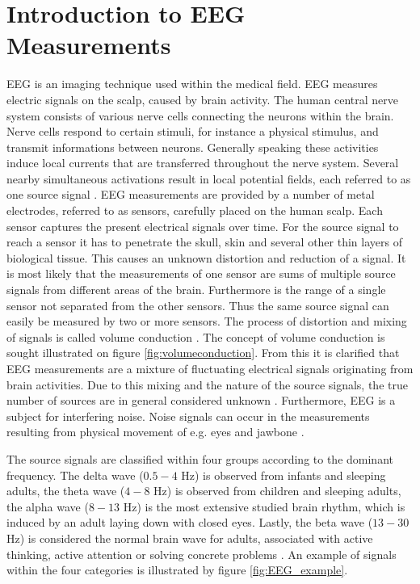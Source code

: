 \section{Introduction to EEG Measurements}\label{sec:EEG}
EEG is an imaging technique used within the medical field. EEG measures electric signals on the scalp, caused by brain activity. 
The human central nerve system consists of various nerve cells connecting the neurons within the brain. Nerve cells respond to certain stimuli, for instance a physical stimulus, and transmit informations between neurons.
Generally speaking these activities induce local currents that are transferred throughout the nerve system. 
Several nearby simultaneous activations result in local potential fields, each referred to as one source signal \cite{EEGsignalprocessing}. 
EEG measurements are provided by a number of metal electrodes, referred to as sensors, carefully placed on the human scalp. 
Each sensor captures the present electrical signals over time.
For the source signal to reach a sensor it has to penetrate the skull, skin and several other thin layers of biological tissue. 
This causes an unknown distortion and reduction of a signal.
It is most likely that the measurements of one sensor are sums of multiple source signals from different areas of the brain.
Furthermore is the range of a single sensor not separated from the other sensors. 
Thus the same source signal can easily be measured by two or more sensors.
The process of distortion and mixing of signals is called volume conduction \cite{EEGsignalprocessing}\cite{Van2019}. 
The concept of volume conduction is sought illustrated on figure \ref{fig:volumeconduction}.
From this it is clarified that EEG measurements are a mixture of fluctuating electrical signals originating from brain activities. Due to this mixing and the nature of the source signals, the true number of sources are in general considered unknown \cite{EEGsignalprocessing}. 
Furthermore, EEG is a subject for interfering noise. Noise signals can occur in the measurements resulting from physical movement of e.g. eyes and jawbone \cite{fundamentalEEG}.

The source signals are classified within four groups according to the dominant frequency. 
The delta wave ($0.5-4$ Hz) is observed from infants and sleeping adults, the theta wave ($4-8$ Hz) is observed from children and sleeping adults, the alpha wave ($8-13$ Hz) is the most extensive studied brain rhythm, which is induced by an adult laying down with closed eyes. 
Lastly, the beta wave ($13-30$ Hz) is considered the normal brain wave for adults, associated with active thinking, active attention or solving concrete problems \cite{EEGsignalprocessing}. 
An example of signals within the four categories is illustrated by figure \ref{fig:EEG_example}.   

